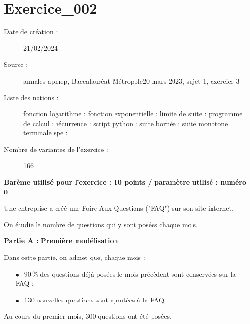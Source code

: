 \SeulementModeEnonce{}




\section{Exercice\_002}

\begin{description}
\item[Date de création : ]21/02/2024
\item[Source : ]annales apmep, Baccalauréat Métropole20 mars 2023, sujet 1, exercice 3
\item[Liste des notions : ]fonction logarithme : fonction exponentielle : limite de suite : programme de calcul : récurrence : script python : suite bornée : suite monotone : terminale spe : 
\item[Nombre de variantes de l'exercice : ]166
\end{description}

\centerline{\bf\large Barème utilisé pour l'exercice : 10 points / paramètre utilisé : numéro 0}



\EXERCICE

\medskip

Une entreprise a créé une Foire Aux Questions ("FAQ") sur son site internet.

\medskip

On étudie le nombre de questions qui y sont posées chaque mois.

\bigskip

\textbf{Partie A : Première modélisation}

\medskip

Dans cette partie, on admet que, chaque mois :

\begin{itemize}
\item[$\bullet~~$]$90$\,\% des questions déjà posées le mois précédent sont conservées sur la FAQ ;
\item[$\bullet~~$]$130$ nouvelles questions sont ajoutées à la FAQ.
\end{itemize}

Au cours du premier mois, $300$ questions ont été posées.

